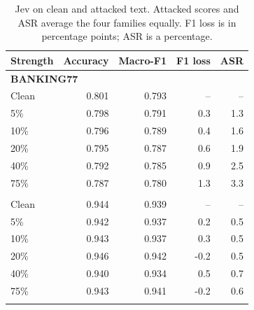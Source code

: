 \begin{table}[H]\centering\footnotesize
\caption{Jev on clean and attacked text. Attacked scores and ASR average the four families equally. F1 loss is in percentage points; ASR is a percentage.}
\setlength{\tabcolsep}{3pt}
\begin{tabular}{@{}lrrrr@{}}\toprule
Strength & Accuracy & Macro-F1 & F1 loss & ASR \\ \midrule
\multicolumn{5}{l}{\textbf{BANKING77}} \\
Clean & 0.801 & 0.793 & -- & -- \\
5\% & 0.798 & 0.791 & 0.3 & 1.3 \\
10\% & 0.796 & 0.789 & 0.4 & 1.6 \\
20\% & 0.795 & 0.787 & 0.6 & 1.9 \\
40\% & 0.792 & 0.785 & 0.9 & 2.5 \\
75\% & 0.787 & 0.780 & 1.3 & 3.3 \\
\addlinespace
\multicolumn{5}{l}{\textbf{TREC}} \\
Clean & 0.944 & 0.939 & -- & -- \\
5\% & 0.942 & 0.937 & 0.2 & 0.5 \\
10\% & 0.943 & 0.937 & 0.3 & 0.5 \\
20\% & 0.946 & 0.942 & -0.2 & 0.5 \\
40\% & 0.940 & 0.934 & 0.5 & 0.7 \\
75\% & 0.943 & 0.941 & -0.2 & 0.6 \\
\addlinespace
\bottomrule\end{tabular}\label{tab:jev}\end{table}
